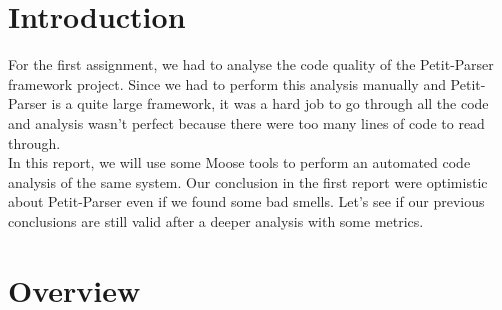 

\usepackage{todonotes}



\section{Introduction}
For the first assignment, we had to analyse the code quality of the Petit-Parser framework project. Since we had to perform this analysis manually and Petit-Parser is a quite large framework, it was a hard job to go through all the code and analysis wasn't perfect because there were too many lines of code to read through. \\
In this report, we will use some Moose tools to perform an automated code analysis of the same system. Our conclusion in the first report were optimistic about Petit-Parser even if we found some bad smells. Let's see if our previous conclusions are still valid after a deeper analysis with some metrics.

\section{Overview}
